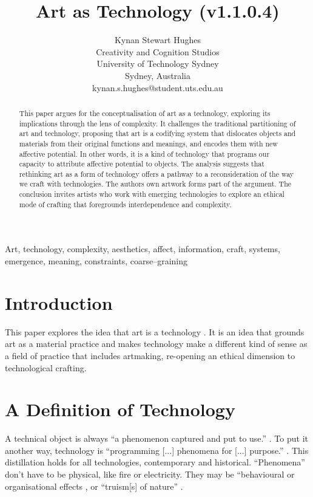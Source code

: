 \documentclass[letter:wpaper]{article}
\title{Art as Technology (v1.1.0.4)}
\author{Kynan Stewart Hughes\\
Creativity and Cognition Studios\\
University of Technology Sydney\\
Sydney, Australia\\
kynan.s.hughes@student.uts.edu.au\\
\newline
\newline
}
\begin{document}
 
\maketitle
\begin{abstract}

    This paper argues for the conceptualisation of art as a technology, exploring its implications through the lens of complexity. It challenges the traditional partitioning of art and technology, proposing that art is a codifying system that dislocates objects and materials from their original functions and meanings, and encodes them with new affective potential. In other words, it is a kind of technology that programs our capacity to attribute affective potential to objects. The analysis suggests that rethinking art as a form of technology offers a pathway to a reconsideration of the way we craft with technologies. The authors own artwork forms part of the argument. The conclusion invites artists who work with emerging technologies to explore an ethical mode of crafting that foregrounds interdependence and complexity.

\end{abstract}


Art, technology, complexity, aesthetics, affect, information, craft, systems, emergence, meaning, constraints, coarse–graining

\section{Introduction}

    This paper explores the idea that art is a technology \citep[pp.74–75]{SauvagnarguesArtmchns2016} \citep{GellThTchnlgyOfEnchntmnt1992} \citep[p.202]{OSullivanFrmAsthtcsToThAbstrctMchn2010}. It is an idea that grounds art as a material practice and makes technology make a different kind of sense as a field of practice that includes artmaking, re-opening an ethical dimension to technological crafting. 
    
\section{A Definition of Technology} 

    A technical object is always ``a phenomenon captured and put to use.'' \citep[p.53]{theNatureOfTechnology2009}. To put it another way, technology is ``programming [...] phenomena for [...] purpose.'' \citep[p.53]{theNatureOfTechnology2009}. This distillation holds for all technologies, contemporary and historical. ``Phenomena'' don't have to be physical, like fire or electricity. They may be ``behavioural or organisational  effects \citep[p.55]{theNatureOfTechnology2009}, or ``truism[s] of nature'' \citep[p.45]{theNatureOfTechnology2009}.
\end{document}
